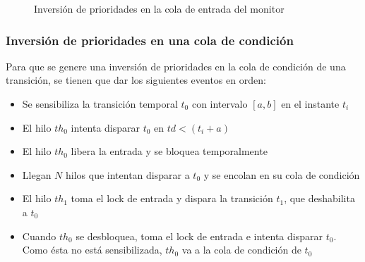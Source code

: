 \begin{figure}[H]
  \centering
    \label{fig:Inv_prior_entrada}
\end{figure}
\clearpage
\begin{figure}[H]
    \ContinuedFloat
    \label{fig:Inv_prior_entrada}
\end{figure}
\clearpage
\begin{figure}[H]
    \ContinuedFloat
    \label{fig:Inv_prior_entrada}
\end{figure}
\clearpage
\begin{figure}[H]
    \ContinuedFloat
    \caption{Inversión de prioridades en la cola de entrada del monitor}
    \label{fig:Inv_prior_entrada}
\end{figure}

\subsubsection{Inversión de prioridades en una cola de condición}

Para que se genere una inversión de prioridades en la cola de condición de una
transición, se tienen que dar los siguientes eventos en orden:
\begin{itemize}
  \item Se sensibiliza la transición temporal $t_{0}$ con intervalo $[a,b]$ en
  el instante $t_{i}$
  \item El hilo $th_{0}$ intenta disparar $t_{0}$ en $td < (t_{i} + a)$
  \item El hilo $th_{0}$ libera la entrada y se bloquea temporalmente
  \item Llegan $N$ hilos que intentan disparar a $t_{0}$ y se encolan en su cola
  de condición
  \item El hilo $th_{1}$ toma el lock de entrada y dispara la transición
  $t_{1}$, que deshabilita a $t_{0}$
  \item Cuando $th_{0}$ se desbloquea, toma el lock de entrada e intenta
  disparar $t_{0}$. Como ésta no está sensibilizada, $th_{0}$ va a la cola de
  condición de $t_{0}$
\end{itemize}
 
